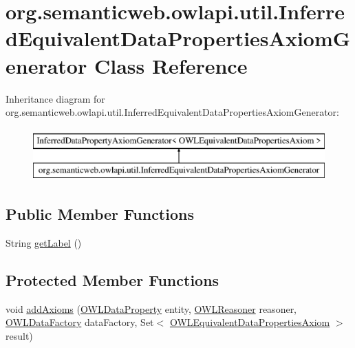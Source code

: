 \hypertarget{classorg_1_1semanticweb_1_1owlapi_1_1util_1_1_inferred_equivalent_data_properties_axiom_generator}{\section{org.\-semanticweb.\-owlapi.\-util.\-Inferred\-Equivalent\-Data\-Properties\-Axiom\-Generator Class Reference}
\label{classorg_1_1semanticweb_1_1owlapi_1_1util_1_1_inferred_equivalent_data_properties_axiom_generator}
}
Inheritance diagram for org.\-semanticweb.\-owlapi.\-util.\-Inferred\-Equivalent\-Data\-Properties\-Axiom\-Generator\-:\begin{figure}[H]
\begin{center}
\leavevmode
\includegraphics[height=2.000000cm]{classorg_1_1semanticweb_1_1owlapi_1_1util_1_1_inferred_equivalent_data_properties_axiom_generator}
\end{center}
\end{figure}
\subsection*{Public Member Functions}
\begin{DoxyCompactItemize}
\item 
String \hyperlink{classorg_1_1semanticweb_1_1owlapi_1_1util_1_1_inferred_equivalent_data_properties_axiom_generator_aaf93c1c2b1d7dec6aa37107fb33ec31e}{get\-Label} ()
\end{DoxyCompactItemize}
\subsection*{Protected Member Functions}
\begin{DoxyCompactItemize}
\item 
void \hyperlink{classorg_1_1semanticweb_1_1owlapi_1_1util_1_1_inferred_equivalent_data_properties_axiom_generator_a1ce6580f1dd02d1d4c959b08f8c5a4e5}{add\-Axioms} (\hyperlink{interfaceorg_1_1semanticweb_1_1owlapi_1_1model_1_1_o_w_l_data_property}{O\-W\-L\-Data\-Property} entity, \hyperlink{interfaceorg_1_1semanticweb_1_1owlapi_1_1reasoner_1_1_o_w_l_reasoner}{O\-W\-L\-Reasoner} reasoner, \hyperlink{interfaceorg_1_1semanticweb_1_1owlapi_1_1model_1_1_o_w_l_data_factory}{O\-W\-L\-Data\-Factory} data\-Factory, Set$<$ \hyperlink{interfaceorg_1_1semanticweb_1_1owlapi_1_1model_1_1_o_w_l_equivalent_data_properties_axiom}{O\-W\-L\-Equivalent\-Data\-Properties\-Axiom} $>$ result)
\end{DoxyCompactItemize}


